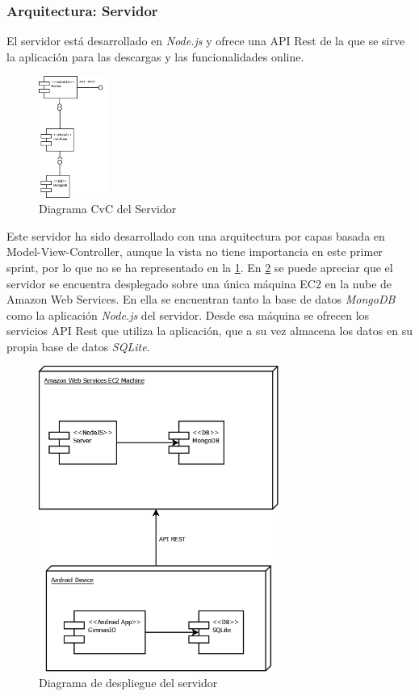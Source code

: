 \documentclass[11pt,a4paper]{report}
\begin{document}
\subsubsection{Arquitectura: Servidor}
El servidor está desarrollado en \textit{Node.js} y ofrece una API Rest de la que se sirve la aplicación para las descargas y las funcionalidades online. 
\begin{figure}[H]
	\centering
	\includegraphics[width=0.2\textwidth]{capturicas/CvCSer.png}
	\caption{Diagrama CvC del Servidor}
	\label{fig: CvCSer}
\end{figure}
Este servidor ha sido desarrollado con una arquitectura por capas basada en Model-View-Controller, aunque la vista no tiene importancia en este primer sprint, por lo que no se ha representado en la \ref{fig: CvCSer}. En \ref{fig: depSer} se puede apreciar que el servidor se encuentra desplegado sobre una única máquina EC2 en la nube de Amazon Web Services. En ella se encuentran tanto la base de datos \textit{MongoDB} como la aplicación \textit{Node.js} del servidor. Desde esa máquina se ofrecen los servicios API Rest que utiliza la aplicación, que a su vez almacena los datos en su propia base de datos \textit{SQLite}.
\begin{figure}[H]
	\centering
	\includegraphics[width=0.7\textwidth]{capturicas/depSer.png}
	\caption{Diagrama de despliegue del servidor}
	\label{fig: depSer}
\end{figure}
\end{document}
